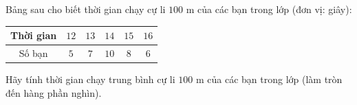 \begin{ex}
Bảng sau cho biết thời gian chạy cự li $100$ m của các bạn trong lớp (đơn vị: giây):
\begin{center}
\begin{tabular}{|c|c|c|c|c|c|}\hline
Thời gian & $12$ & $13$ & $14$ & $15$ & $16$\\\hline
Số bạn & $5$ & $7$ & $10$ & $8$ & $6$\\\hline
\end{tabular}
\end{center}
Hãy tính thời gian chạy trung bình cự li $100$ m của các bạn trong lớp (làm tròn đến hàng phần nghìn).
\end{ex}
